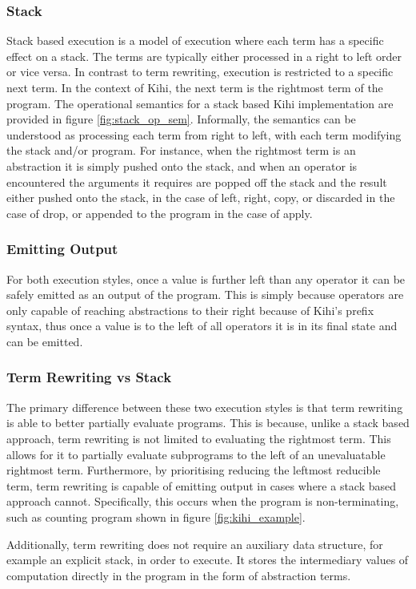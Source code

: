 \subsubsection*{Stack}
Stack based execution is a model of execution where each term has a specific effect on a stack. The terms are typically either processed in a right to left order or vice versa. In contrast to term rewriting, execution is restricted to a specific next term. In the context of Kihi, the next term is the rightmost term of the program. The operational semantics for a stack based Kihi implementation are provided in figure \ref{fig:stack_op_sem}. Informally, the semantics can be understood as processing each term from right to left, with each term modifying the stack and/or program. For instance, when the rightmost term is an abstraction it is simply pushed onto the stack, and when an operator is encountered the arguments it requires are popped off the stack and the result either pushed onto the stack, in the case of left, right, copy, or discarded in the case of drop, or appended to the program in the case of apply.

\subsubsection{Emitting Output}
For both execution styles, once a value is further left than any operator it can be safely emitted as an output of the program. This is simply because operators are only capable of reaching abstractions to their right because of Kihi's prefix syntax, thus once a value is to the left of all operators it is in its final state and can be emitted.

\subsubsection{Term Rewriting vs Stack}
The primary difference between these two execution styles is that term rewriting is able to better partially evaluate programs. This is because, unlike a stack based approach, term rewriting is not limited to evaluating the rightmost term. This allows for it to partially evaluate subprograms to the left of an unevaluatable rightmost term. Furthermore, by prioritising reducing the leftmost reducible term, term rewriting is capable of emitting output in cases where a stack based approach cannot. Specifically, this occurs when the program is non-terminating, such as counting program shown in figure \ref{fig:kihi_example}.

Additionally, term rewriting does not require an auxiliary data structure, for example an explicit stack, in order to execute. It stores the intermediary values of computation directly in the program in the form of abstraction terms.

